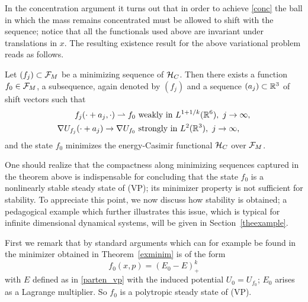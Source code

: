 \documentclass[11pt]{article}
\begin{document}
In the concentration argument it turns out that in order to achieve \eqref{conc}
the ball in which the mass remains concentrated must be allowed to shift
with the sequence; notice that all the functionals used above are invariant
under translations in $x$. The resulting existence result for the above
variational problem reads as follows.
%
\begin{theorem} \label{exminim}
  Let $(f_j) \subset {\cal F}_M$ be a minimizing sequence of 
  ${\cal H}_C$. Then there exists 
  a function $f_0\in {\cal F}_M$, a subsequence,
  again denoted by $(f_j)$ and a sequence $(a_j) \subset \mathbb R^3$ of shift vectors
  such that 
  \begin{align*}
    f_j(\cdot + a_j,\cdot) \rightharpoonup f_0 
    &
    \ \mbox{weakly in}\ L^{1+1/k} (\mathbb R^6),\ j\to \infty,\\
    \nabla  U_{f_j} (\cdot + a_j) 
    \to \nabla U_{f_0}
    &
    \ \mbox{strongly in}\ L^2 (\mathbb R^3),\ j\to \infty,
  \end{align*}
  and the state $f_0$ minimizes the energy-Casimir functional ${\cal H}_C$ over ${\cal F}_M$.
\end{theorem}
%
%
One should realize that the compactness along minimizing sequences
captured in the theorem above is indispensable for concluding that
the state $f_0$ is a nonlinearly stable steady state of (VP);
its minimizer property is not sufficient for stability.
To appreciate this point, we now discuss how stability is obtained;
a pedagogical example which further illustrates this issue,
which is typical for infinite dimensional dynamical systems,
will be given in Section~\ref{theexample}.

First we remark that by standard arguments which can for example be found
in \cite[Theorem~5.1]{Rein07} the minimizer obtained
in Theorem~\ref{exminim} is of the form
\begin{equation} \label{poly}
  f_0(x,p) = (E_0 - E)_+^k
\end{equation}
with $E$ defined as in \eqref{parten_vp} with the induced potential
$U_0=U_{f_0}$; $E_0$ arises as a Lagrange multiplier.
So $f_0$ is a polytropic steady state of (VP).
\end{document}
